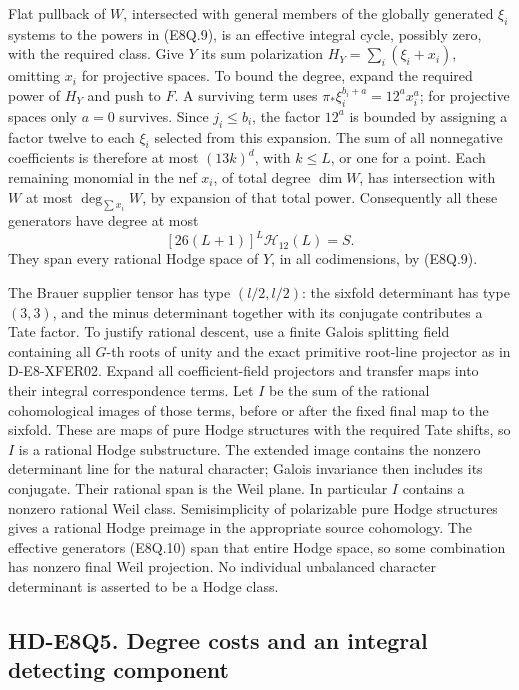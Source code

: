 Flat pullback of \(W\), intersected with general members
of the globally generated \(\xi_i\) systems to the powers
in (E8Q.9), is an effective integral cycle, possibly zero,
with the required class. Give \(Y\) its sum polarization
\(H_Y=\sum_i(\xi_i+x_i)\), omitting \(x_i\) for projective
spaces. To bound the degree, expand the required power of
\(H_Y\) and push to \(F\). A surviving term uses
\(\pi_*\xi_i^{b_i+a}=12^a x_i^a\); for projective spaces
only \(a=0\) survives. Since \(j_i\le b_i\), the factor
\(12^a\) is bounded by assigning a factor twelve to each
\(\xi_i\) selected from this expansion. The sum of all
nonnegative coefficients is therefore at most
\((13k)^d\), with \(k\le L\), or one for a point.
Each remaining monomial in the nef \(x_i\), of total
degree \(\dim W\), has intersection with \(W\) at most
\(\deg_{\sum x_i}W\), by expansion of that total power.
Consequently all these generators have degree at most
\[
                   [26(L+1)]^L\mathcal H_{12}(L)=S.           \tag{E8Q.10}
\]
They span every rational Hodge space of \(Y\), in all
codimensions, by (E8Q.9).

The Brauer supplier tensor has type \((l/2,l/2)\):
the sixfold determinant has type \((3,3)\), and the
minus determinant together with its conjugate contributes
a Tate factor. To justify rational descent, use a finite
Galois splitting field containing all \(G\)-th roots of
unity and the exact primitive root-line projector as in
D-E8-XFER02. Expand all coefficient-field projectors
and transfer maps into their integral correspondence terms.
Let \(I\) be the sum of the rational cohomological images
of those terms, before or after the fixed final map to the
sixfold. These are maps of pure Hodge structures with the
required Tate shifts, so \(I\) is a rational Hodge substructure.
The extended image contains the nonzero determinant line
for the natural character; Galois invariance then includes
its conjugate. Their rational span is the Weil plane.
In particular \(I\) contains a nonzero rational Weil class.
Semisimplicity of polarizable pure Hodge structures gives
a rational Hodge preimage in the appropriate source
cohomology. The effective generators (E8Q.10) span that
entire Hodge space, so some combination has nonzero final
Weil projection. No individual unbalanced character
determinant is asserted to be a Hodge class.

\subsection*{HD-E8Q5. Degree costs and an integral detecting component}

